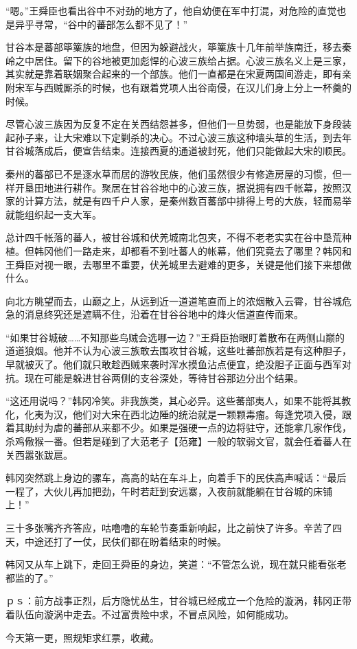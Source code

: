 “嗯。”王舜臣也看出谷中不对劲的地方了，他自幼便在军中打混，对危险的直觉也是异乎寻常，“谷中的蕃部怎么都不见了！”

甘谷本是蕃部筚篥族的地盘，但因为躲避战火，筚篥族十几年前举族南迁，移去秦岭之中居住。留下的谷地被更加彪悍的心波三族给占据。心波三族名义上是三家，其实就是靠着联姻聚合起来的一个部族。他们一直都是在宋夏两国间游走，即有亲附宋军与西贼厮杀的时候，也有跟着党项人出谷南侵，在汉儿们身上分上一杯羹的时候。

尽管心波三族因为反复不定在关西结怨甚多，但他们一旦势弱，也是能放下身段装起孙子来，让大宋难以下定剿杀的决心。不过心波三族这种墙头草的生活，到去年甘谷城落成后，便宣告结束。连接西夏的通道被封死，他们只能做起大宋的顺民。

秦州的蕃部已不是逐水草而居的游牧民族，他们虽然很少有修造房屋的习惯，但一样开垦田地进行耕作。聚居在甘谷谷地中的心波三族，据说拥有四千帐幕，按照汉家的计算方法，就是有四千户人家，是秦州数百蕃部中排得上号的大族，轻而易举就能组织起一支大军。

总计四千帐落的蕃人，被甘谷城和伏羌城南北包夹，不得不老老实实在谷中垦荒种植。但韩冈他们一路走来，却都看不到吐蕃人的帐幕，他们究竟去了哪里？韩冈和王舜臣对视一眼，去哪里不重要，伏羌城里去避难的更多，关键是他们接下来想做什么。

向北方眺望而去，山巅之上，从远到近一道道笔直而上的浓烟散入云霄，甘谷城危急的消息终究还是遮瞒不住，沿着在甘谷谷地中的烽火信道直传而来。

“如果甘谷城破……不知那些鸟贼会选哪一边？”王舜臣抬眼盯着散布在两侧山巅的道道狼烟。他并不认为心波三族敢去围攻甘谷城，这些吐蕃部族若是有这种胆子，早就被灭了。他们就只敢趁西贼来袭时浑水摸鱼沾点便宜，绝没胆子正面与西军对抗。现在可能是躲进甘谷两侧的支谷深处，等待甘谷那边分出个结果。

“这还用说吗？”韩冈冷笑。非我族类，其心必异。这些蕃部夷人，如果不能将其教化，化夷为汉，他们对大宋在西北边陲的统治就是一颗颗毒瘤。每逢党项入侵，跟着其助纣为虐的蕃部从来都不少。如果是强硬一点的边将驻守，还能拿几家作伐，杀鸡儆猴一番。但若是碰到了大范老子【范雍】一般的软弱文官，就会任着蕃人在关西嚣张跋扈。

韩冈突然跳上身边的骡车，高高的站在车斗上，向着手下的民伕高声喊话：“最后一程了，大伙儿再加把劲，午时若赶到安远寨，入夜前就能躺在甘谷城的床铺上！”

三十多张嘴齐齐答应，咕噜噜的车轮节奏重新响起，比之前快了许多。辛苦了四天，中途还打了一仗，民伕们都在盼着结束的时候。

韩冈又从车上跳下，走回王舜臣的身边，笑道：“不管怎么说，现在就只能看张老都监的了。”

ｐｓ：前方战事正烈，后方隐忧丛生，甘谷城已经成立一个危险的漩涡，韩冈正带着队伍向漩涡中走去。不过富贵险中求，不冒点风险，如何能成功。

今天第一更，照规矩求红票，收藏。

